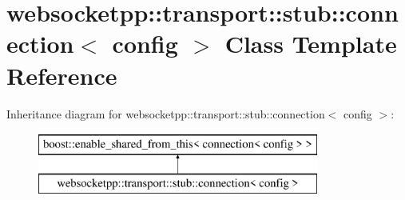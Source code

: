 \hypertarget{classwebsocketpp_1_1transport_1_1stub_1_1connection}{}\section{websocketpp\+:\+:transport\+:\+:stub\+:\+:connection$<$ config $>$ Class Template Reference}
\label{classwebsocketpp_1_1transport_1_1stub_1_1connection}
Inheritance diagram for websocketpp\+:\+:transport\+:\+:stub\+:\+:connection$<$ config $>$\+:\begin{figure}[H]
\begin{center}
\leavevmode
\includegraphics[height=2.000000cm]{classwebsocketpp_1_1transport_1_1stub_1_1connection}
\end{center}
\end{figure}
